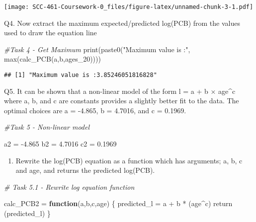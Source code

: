 \documentclass[
]{article}
\newenvironment{Shaded}{\begin{snugshade}}{\end{snugshade}}
\newcommand{\CommentTok}[1]{\textcolor[rgb]{0.56,0.35,0.01}{\textit{#1}}}
\newcommand{\ControlFlowTok}[1]{\textcolor[rgb]{0.13,0.29,0.53}{\textbf{#1}}}
\newcommand{\FloatTok}[1]{\textcolor[rgb]{0.00,0.00,0.81}{#1}}
\newcommand{\FunctionTok}[1]{\textcolor[rgb]{0.00,0.00,0.00}{#1}}
\newcommand{\NormalTok}[1]{#1}
\newcommand{\OtherTok}[1]{\textcolor[rgb]{0.56,0.35,0.01}{#1}}
\newcommand{\SpecialCharTok}[1]{\textcolor[rgb]{0.00,0.00,0.00}{#1}}
\newcommand{\StringTok}[1]{\textcolor[rgb]{0.31,0.60,0.02}{#1}}
\providecommand{\tightlist}{%
  \setlength{\itemsep}{0pt}\setlength{\parskip}{0pt}}
\begin{document}
\texttt{[image: SCC-461-Coursework-0\_files/figure-latex/unnamed-chunk-3-1.pdf]}

Q4. Now extract the maximum expected/predicted log(PCB) from the values
used to draw the equation line

\begin{Shaded}
\begin{Highlighting}[]
\CommentTok{\#Task 4 {-} Get Maximum}
\FunctionTok{print}\NormalTok{(}\FunctionTok{paste0}\NormalTok{(}\StringTok{"Maximum value is :"}\NormalTok{, }\FunctionTok{max}\NormalTok{(}\FunctionTok{calc\_PCB}\NormalTok{(a,b,ages\_20))))}
\end{Highlighting}
\end{Shaded}

\begin{verbatim}
## [1] "Maximum value is :3.85246051816828"
\end{verbatim}

Q5. It can be shown that a non-linear model of the form l = a + b ×
age\^{}c where a, b, and c are constants provides a slightly better fit
to the data. The optimal choices are a = -4.865, b = 4.7016, and c =
0.1969.

\begin{Shaded}
\begin{Highlighting}[]
\CommentTok{\#Task 5 {-} Non{-}linear model}

\NormalTok{a2 }\OtherTok{=} \SpecialCharTok{{-}}\FloatTok{4.865}
\NormalTok{b2 }\OtherTok{=} \FloatTok{4.7016}
\NormalTok{c2 }\OtherTok{=} \FloatTok{0.1969}
\end{Highlighting}
\end{Shaded}

\begin{enumerate}
\def\labelenumi{(\alph{enumi})}
\tightlist
\item
  Rewrite the log(PCB) equation as a function which has arguments; a, b,
  c and age, and returns the predicted log(PCB).
\end{enumerate}

\begin{Shaded}
\begin{Highlighting}[]
\CommentTok{\# Task 5.1 {-} Rewrite log equation function}

\NormalTok{calc\_PCB2 }\OtherTok{=} \ControlFlowTok{function}\NormalTok{(a,b,c,age) \{}
\NormalTok{  predicted\_l }\OtherTok{=}\NormalTok{ a }\SpecialCharTok{+}\NormalTok{ b }\SpecialCharTok{*}\NormalTok{ (age}\SpecialCharTok{\^{}}\NormalTok{c) }
  \FunctionTok{return}\NormalTok{ (predicted\_l)}
\NormalTok{\}}
\end{Highlighting}
\end{Shaded}
\end{document}
